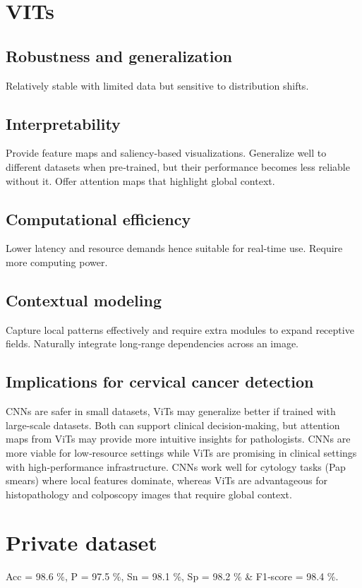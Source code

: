 \documentclass[final,5p,times,twocolumn,authoryear]{elsarticle}
\begin{document}
\section{VITs}
\subsection{Robustness and generalization}
Relatively stable with limited data but sensitive to distribution shifts.
\subsection{Interpretability}
Provide feature maps and saliency-based visualizations. 
Generalize well to different datasets when pre‑trained, but their performance becomes less reliable without it. 
Offer attention maps that highlight global context.
\subsection{Computational efficiency}
Lower latency and resource demands hence suitable for real‑time use. 
Require more computing power.
\subsection{Contextual modeling}
Capture local patterns effectively and require extra modules to expand receptive fields. 
Naturally integrate long‑range dependencies across an image.
\subsection{Implications for cervical cancer detection}
CNNs are safer in small datasets, ViTs may generalize better if trained with large‑scale datasets. 
Both can support clinical decision‑making, but attention maps from ViTs may provide more intuitive insights for pathologists. 
CNNs are more viable for low‑resource settings while ViTs are promising in clinical settings with high‑performance infrastructure. 
CNNs work well for cytology tasks (Pap smears) where local features dominate, whereas ViTs are advantageous for histopathology and colposcopy images that require global context.
\section{Private dataset}
Acc = 98.6 \%, P = 97.5 \%, Sn = 98.1 \%, Sp = 98.2 \% \& F1‑score = 98.4 \%.
\end{document}

